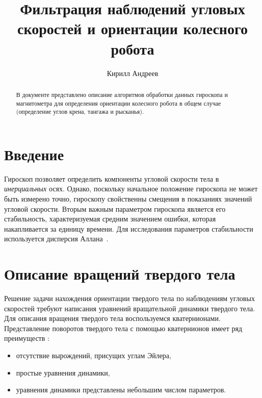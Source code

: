 \documentclass{article}
\title{Фильтрация наблюдений угловых скоростей и ориентации колесного робота}
\author{Кирилл Андреев}
\begin{document}
\maketitle
\begin {abstract}
В документе представлено описание алгоритмов обработки данных гироскопа и
магнитометра для определения ориентации колесного робота в общем случае
(определение углов крена, тангажа и рысканья).
\end{abstract}
\tableofcontents
\pagebreak
\section{Введение}
Гироскоп позволяет определить компоненты угловой скорости тела в
\emph{инерциальных} осях. Однако, поскольку начальное положение гироскопа не
может быть измерено точно, гироскопу свойственны смещения в показаниях
значений угловой скорости. Вторым важным параметром гироскопа является его
стабильность, характеризуемая средним значением ошибки, которая накапливается
за единицу времени. Для исследования параметров стабильности используется
дисперсия Аллана~\cite{vectorNav}.
\section{Описание вращений твердого тела}
Решение задачи нахождения ориентации твердого тела по наблюдениям угловых
скоростей требуют написания уравнений вращательной динамики твердого тела. Для
описания вращения твердого тела воспользуемся кватернионами. Представление
поворотов твердого тела с помощью кватернионов имеет ряд преимуществ
\cite{amelkinMIPT}:
\begin{itemize}
\item отсутствие вырождений, присущих углам Эйлера,
\item простые уравнения динамики,
\item уравнения динамики представлены небольшим числом параметров.
\end{itemize}
\end{document}
